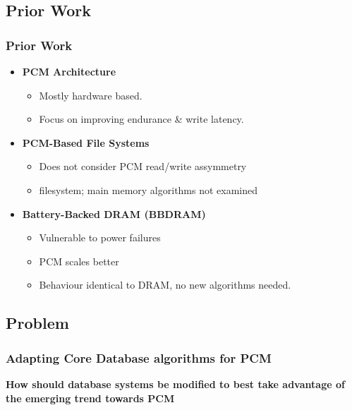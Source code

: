 \subsection{Prior Work}

\begin{frame}
\frametitle{Prior Work}

\begin{itemize}
\item \textbf{PCM Architecture}
	\begin{itemize}
	\item Mostly hardware based. 
	\item Focus on improving endurance \& write latency.
	\end{itemize}
\item \textbf{PCM-Based File Systems}
	\begin{itemize}
	\item Does not consider PCM read/write assymmetry
	\item filesystem; main memory algorithms not examined
	\end{itemize}
\item \textbf{Battery-Backed DRAM (BBDRAM)}
	\begin{itemize}
	\item Vulnerable to power failures
	\item PCM scales better
	\item Behaviour identical to DRAM, no new algorithms needed.
	\end{itemize}
\end{itemize}


\end{frame}




\subsection{Problem}

\begin{frame}
\frametitle{Adapting Core Database algorithms for PCM}

\textbf{How should database systems be modified to best take advantage of the emerging trend towards PCM}

\end{frame}

